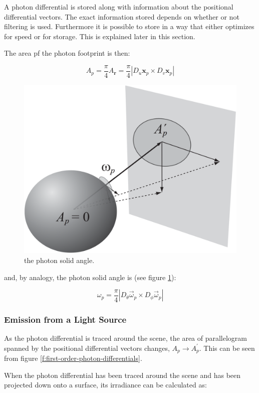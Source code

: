 A photon differential is stored along with information about the positional differential vectors. The exact information stored depends on whether or not filtering is used. Furthermore it is possible to store in a way that either optimizes for speed or for storage. This is explained later in this section.

The area pf the photon footprint is then:

\begin{equation*}
	A_p=\frac{\pi}{4}A_{\mathbf{r}}=\frac{\pi}{4}|D_u\mathbf{x}_p\times D_v\mathbf{x}_p|
\end{equation*}

\begin{figure}
\sidecaption
	\includegraphics[width=.65\textwidth]{graphics/pm/pm-13-6}
	\caption{the photon solid angle.}
	\label{f:photon-solid-angle}
\end{figure}

and, by analogy, the photon solid angle is (see figure \ref{f:photon-solid-angle}):

\begin{equation*}
	\omega_p=\frac{\pi}{4}|D_{\theta}\vec{\omega}_p\times D_{\phi}\vec{\omega}_p|
\end{equation*}



\subsubsection{Emission from a Light Source}
As the photon differential is traced around the scene, the area of parallelogram spanned by the positional differential vectors changes, $A_p\to A^{'}_{p}$. This can be seen from figure \ref{f:first-order-photon-differentials}.

When the photon differential has been traced around the scene and has been projected down onto a surface, its irradiance can be calculated as:

